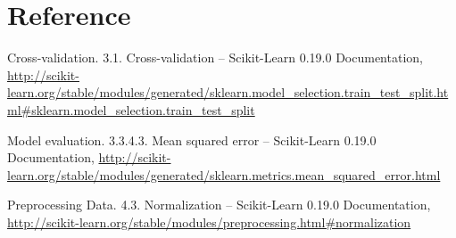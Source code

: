 \documentclass[12pt]{article} %
\begin{document}

\section{Reference}

Cross-validation. 3.1. Cross-validation -- Scikit-Learn 0.19.0 Documentation, \url{http://scikit-learn.org/stable/modules/generated/sklearn.model_selection.train_test_split.html#sklearn.model_selection.train_test_split}

Model evaluation. 3.3.4.3. Mean squared error -- Scikit-Learn 0.19.0 Documentation, \url{http://scikit-learn.org/stable/modules/generated/sklearn.metrics.mean_squared_error.html}

Preprocessing Data. 4.3. Normalization -- Scikit-Learn 0.19.0 Documentation, \url{http://scikit-learn.org/stable/modules/preprocessing.html#normalization}

\end{document}
